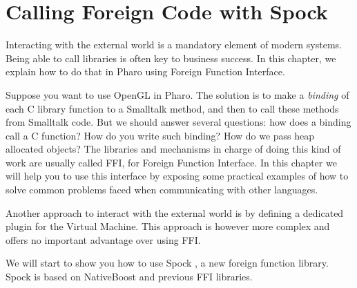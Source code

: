\documentclass[a4paper,10pt,twoside]{book}
\begin{document}
	\sloppy
\fi


\newcommand{\Spock}[0]{Spock } %
\chapter{Calling Foreign Code with Spock}\label{cha:alien}


Interacting with the external world is a mandatory element of modern systems. Being able to call libraries is often key to business  success. In this chapter, we explain how to do that in Pharo using Foreign Function Interface. 


Suppose you want to use OpenGL in Pharo. %
The solution is to make a \emph{binding} of each C library function to a Smalltalk method,  and then to call these methods from Smalltalk code. But we should answer several questions: how does a binding call a 
C function? How do you write such binding? How do we pass heap allocated objects? The libraries and mechanisms in charge of doing this kind of work are usually called FFI, for Foreign Function Interface. In this chapter we will help you to use this interface by exposing some practical examples of
how to solve common problems faced when communicating with other languages.


Another approach to interact with the external world is by defining a
dedicated plugin for the Virtual Machine. This approach is however
more complex and offers no important advantage over using FFI.

We will start to show you how to use \Spock, a new foreign function library. \Spock is based on NativeBoost and previous FFI libraries.
\end{document}
